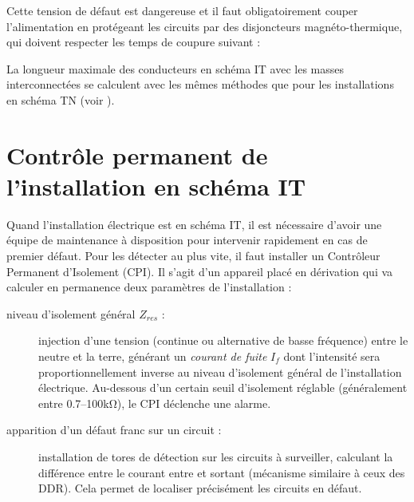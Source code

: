 Cette tension de défaut est dangereuse et il faut obligatoirement couper l'alimentation en protégeant les circuits par des disjoncteurs magnéto-thermique, qui doivent respecter les temps de coupure suivant :



La longueur maximale des conducteurs en schéma IT avec les masses interconnectées se calculent avec les mêmes méthodes que pour les installations en schéma TN (voir ).

\section{Contrôle permanent de l'installation en schéma IT}

Quand l'installation électrique est en schéma IT, il est nécessaire d'avoir une équipe de maintenance à disposition pour intervenir rapidement en cas de premier défaut. Pour les détecter au plus vite, il faut installer un Contrôleur Permanent d'Isolement (CPI). Il s'agit d'un appareil placé en dérivation qui va calculer en permanence deux paramètres de l'installation :
\begin{description}
\item[ niveau d'isolement général $Z_{res}$ :] injection d'une tension (continue ou alternative de basse fréquence) entre le neutre et la terre, générant un \emph{courant de fuite} $I_f$ dont l'intensité sera proportionnellement inverse au niveau d'isolement général de l'installation électrique. Au-dessous d'un certain seuil d'isolement réglable (généralement entre \numrange{0,7}{100}\si{\kilo\ohm}), le CPI déclenche une alarme. 
\item[ apparition d'un défaut franc sur un circuit :] installation de tores de détection sur les circuits à surveiller, calculant la différence entre le courant entre et sortant (mécanisme similaire à ceux des DDR). Cela permet de localiser précisément les circuits en défaut.
\end{description} 

 \begin{figure}[H]
\caption{Installation Isolé-Individuelle avec CPI}
\begin{subfigure}[t]{0.49\linewidth}

\end{subfigure}
\begin{subfigure}[t]{0.49\linewidth}

\end{subfigure}
\end{figure}

